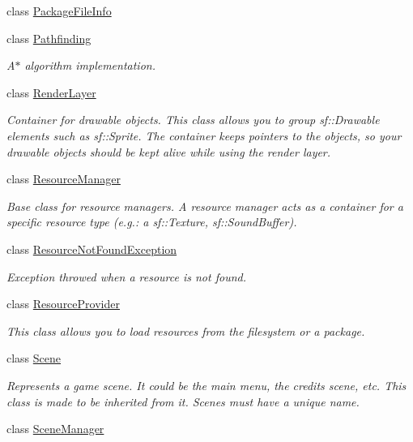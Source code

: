 \begin{DoxyCompactItemize}
class \hyperlink{classzt_1_1_package_file_info}{Package\+File\+Info}
\item 
class \hyperlink{classzt_1_1_pathfinding}{Pathfinding}
\begin{DoxyCompactList}\small\item\em A$\ast$ algorithm implementation. \end{DoxyCompactList}\item 
class \hyperlink{classzt_1_1_render_layer}{Render\+Layer}
\begin{DoxyCompactList}\small\item\em Container for drawable objects. This class allows you to group sf\+::\+Drawable elements such as sf\+::\+Sprite. The container keeps pointers to the objects, so your drawable objects should be kept alive while using the render layer. \end{DoxyCompactList}\item 
class \hyperlink{classzt_1_1_resource_manager}{Resource\+Manager}
\begin{DoxyCompactList}\small\item\em Base class for resource managers. A resource manager acts as a container for a specific resource type (e.\+g.\+: a sf\+::\+Texture, sf\+::\+Sound\+Buffer). \end{DoxyCompactList}\item 
class \hyperlink{classzt_1_1_resource_not_found_exception}{Resource\+Not\+Found\+Exception}
\begin{DoxyCompactList}\small\item\em Exception throwed when a resource is not found. \end{DoxyCompactList}\item 
class \hyperlink{classzt_1_1_resource_provider}{Resource\+Provider}
\begin{DoxyCompactList}\small\item\em This class allows you to load resources from the filesystem or a package. \end{DoxyCompactList}\item 
class \hyperlink{classzt_1_1_scene}{Scene}
\begin{DoxyCompactList}\small\item\em Represents a game scene. It could be the main menu, the credits scene, etc. This class is made to be inherited from it. Scenes must have a unique name. \end{DoxyCompactList}\item 
class \hyperlink{classzt_1_1_scene_manager}{Scene\+Manager}

\end{DoxyCompactItemize}
